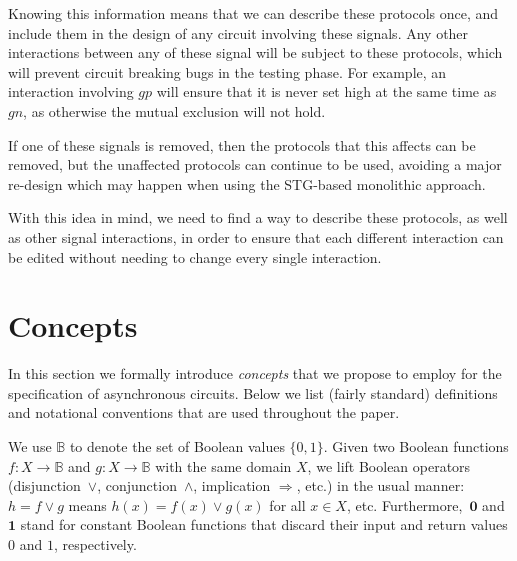 \documentclass[british,compsoc]{IEEEtran}
\begin{document}
Knowing this information means that we can describe these protocols once, and
include them in the design of any circuit involving these signals. Any other
interactions between any of these signal will be subject to these protocols,
which will prevent circuit breaking bugs in the testing phase. For example, an
interaction involving $gp$ will ensure that it is never set high at
the same time as $gn$, as otherwise the mutual exclusion will not hold.

If one of these signals is removed, then the protocols that this affects can
be removed, but the unaffected protocols can continue to be used, avoiding a
major re-design which may happen when using the STG-based monolithic approach.

With this idea in mind, we need to find a way to describe these protocols, as
well as other signal interactions, in order to ensure that each different
interaction can be edited without needing to change every single interaction.

\section{Concepts \label{sec:Concepts}}



In this section we formally introduce \emph{concepts} that we propose
to employ for the specification of asynchronous circuits. Below we
list (fairly standard) definitions and notational conventions that
are used throughout the paper.

We use $\mathbb{B}$ to denote the set of Boolean values $\{0,1\}$.
Given two Boolean functions $f:X\rightarrow\mathbb{B}$ and $g:X\rightarrow\mathbb{B}$
with the same domain $X$, we lift Boolean operators (disjunction~$\vee$,
conjunction~$\wedge$, implication $\Rightarrow$, etc.) in the usual
manner: $h=f\vee g$ means $h(x)=f(x)\vee g(x)$ for all $x\in X$,
etc. Furthermore,~$\mathbf{0}$ and~$\mathbf{1}$ stand for constant
Boolean functions that discard their input and return values $0$
and $1$, respectively.
\end{document}
